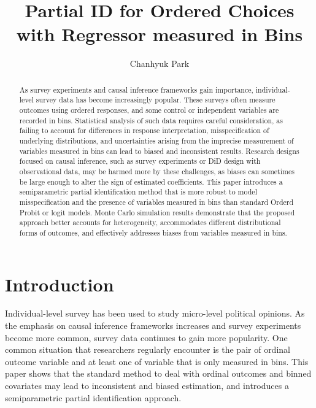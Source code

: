 \documentclass{article}
\title{Partial ID for Ordered Choices with Regressor measured in Bins}
\author{Chanhyuk Park}
\date{}
\begin{document}
    \maketitle

\begin{abstract}
    As survey experiments and causal inference frameworks gain importance, individual-level survey data has become increasingly popular. These surveys often measure outcomes using ordered responses, and some control or independent variables are recorded in bins. Statistical analysis of such data requires careful consideration, as failing to account for differences in response interpretation, misspecification of underlying distributions, and uncertainties arising from the imprecise measurement of variables measured in bins can lead to biased and inconsistent results. Research designs focused on causal inference, such as survey experiments or DiD design with observational data, may be harmed more by these challenges, as biases can sometimes be large enough to alter the sign of estimated coefficients. This paper introduces a semiparametric partial identification method that is more robust to model misspecification and the presence of variables measured in bins than standard Orderd Probit or logit models. Monte Carlo simulation results demonstrate that the proposed approach better accounts for heterogeneity, accommodates different distributional forms of outcomes, and effectively addresses biases from variables measured in bins.
\end{abstract}

\newpage
\section{Introduction}

Individual-level survey has been used to study micro-level political opinions. As the emphasis on causal inference frameworks increases and survey experiments become more common, survey data continues to gain more popularity. One common situation that researchers regularly encounter is the pair of ordinal outcome variable and at least one of variable that is only measured in bins. This paper shows that the standard method to deal with ordinal outcomes and binned covariates may lead to inconsistent and biased estimation, and introduces a semiparametric partial identification approach.
\end{document}
